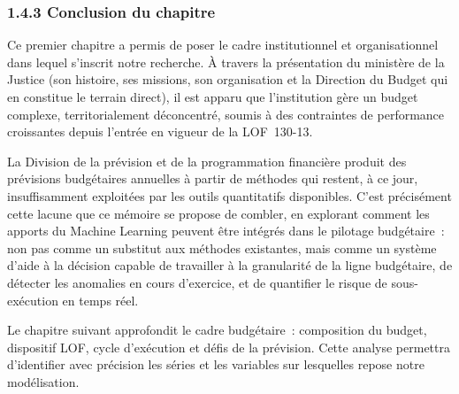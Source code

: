 \subsubsection*{1.4.3 \quad Conclusion du chapitre}

Ce premier chapitre a permis de poser le cadre institutionnel et organisationnel dans lequel s'inscrit notre recherche. \`A travers la pr\'esentation du minist\`ere de la Justice (son histoire, ses missions, son organisation et la Direction du Budget qui en constitue le terrain direct), il est apparu que l'institution g\`ere un budget complexe, territorialement d\'econcentr\'e, soumis \`a des contraintes de performance croissantes depuis l'entr\'ee en vigueur de la LOF~130-13.

La Division de la pr\'evision et de la programmation financi\`ere produit des pr\'evisions budg\'etaires annuelles \`a partir de m\'ethodes qui restent, \`a ce jour, insuffisamment exploit\'ees par les outils quantitatifs disponibles. C'est pr\'ecis\'ement cette lacune que ce m\'emoire se propose de combler, en explorant comment les apports du Machine Learning peuvent \^etre int\'egr\'es dans le pilotage budg\'etaire~: non pas comme un substitut aux m\'ethodes existantes, mais comme un syst\`eme d'aide \`a la d\'ecision capable de travailler \`a la granularit\'e de la ligne budg\'etaire, de d\'etecter les anomalies en cours d'exercice, et de quantifier le risque de sous-ex\'ecution en temps r\'eel.

Le chapitre suivant approfondit le cadre budg\'etaire~: composition du budget, dispositif LOF, cycle d'ex\'ecution et d\'efis de la pr\'evision. Cette analyse permettra d'identifier avec pr\'ecision les s\'eries et les variables sur lesquelles repose notre mod\'elisation.

